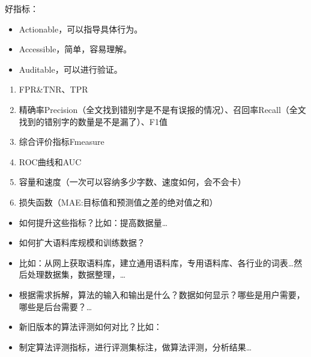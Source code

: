 \documentclass[letterpaper,10pt,english]{sphinxmanual}
\begin{document}
好指标：
\begin{itemize}
\item {} 
Actionable，可以指导具体行为。

\item {} 
Accessible，简单，容易理解。

\item {} 
Auditable，可以进行验证。

\end{itemize}
\begin{enumerate}
%
\item {} 
FPR\&TNR、TPR

\item {} 
精确率Precision（全文找到错别字是不是有误报的情况）、召回率Recall（全文找到的错别字的数量是不是漏了）、F1值

\item {} 
综合评价指标F\sphinxhyphen{}measure

\item {} 
ROC曲线和AUC

\item {} 
容量和速度（一次可以容纳多少字数、速度如何，会不会卡）

\item {} 
损失函数（MAE:目标值和预测值之差的绝对值之和）

\end{enumerate}
\begin{itemize}
\item {} 
如何提升这些指标？比如：提高数据量…

\item {} 
如何扩大语料库规模和训练数据？

\item {} 
比如：从网上获取语料库，建立通用语料库，专用语料库、各行业的词表…然后处理数据集，数据整理，…

\item {} 
根据需求拆解，算法的输入和输出是什么？数据如何显示？哪些是用户需要，哪些是后台需要？…

\item {} 
新旧版本的算法评测如何对比？比如：

\item {} 
制定算法评测指标，进行评测集标注，做算法评测，分析结果…

\end{itemize}
\end{document}

